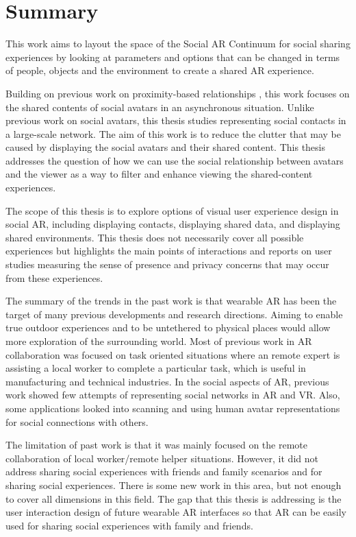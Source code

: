\section{Summary}

This work aims to layout the space of the Social AR Continuum for social sharing experiences by looking at parameters and options that can be changed in terms of people, objects and the environment to create a shared AR experience. 

Building on previous work on proximity-based relationships \cite{Sousa2016}, this work focuses on the shared contents of social avatars in an asynchronous situation. Unlike previous work on social avatars, this thesis studies representing social contacts in a large-scale network. The aim of this work is to reduce the clutter that may be caused by displaying the social avatars and their shared content. This thesis addresses the question of how we can use the social relationship between avatars and the viewer as a way to filter and enhance viewing the shared-content experiences. 

The scope of this thesis is to explore options of visual user experience design in social AR, including displaying contacts, displaying shared data, and displaying shared environments. This thesis does not necessarily cover all possible experiences but highlights the main points of interactions and reports on user studies measuring the sense of presence and privacy concerns that may occur from these experiences. 

The summary of the trends in the past work is that
wearable AR has been the target of many previous developments and research directions. Aiming to enable true outdoor experiences and to be untethered to physical places would allow more exploration of the surrounding world. 
Most of previous work in AR collaboration was focused on task oriented situations where an remote expert is assisting a local worker to complete a particular task, which is useful in manufacturing and technical industries.
In the social aspects of AR, previous work showed few attempts of representing social networks in AR and VR. Also, some applications looked into scanning and using human avatar representations for social connections with others.

The limitation of past work is that it was mainly focused on the remote collaboration of local worker/remote helper situations. However, it did not address sharing social experiences with friends and family scenarios and for sharing social experiences. There is some new work in this area, but not enough to cover all dimensions in this field. The gap that this thesis is addressing is the user interaction design of future wearable AR interfaces so that AR can be easily used for sharing social experiences with family and friends. 

